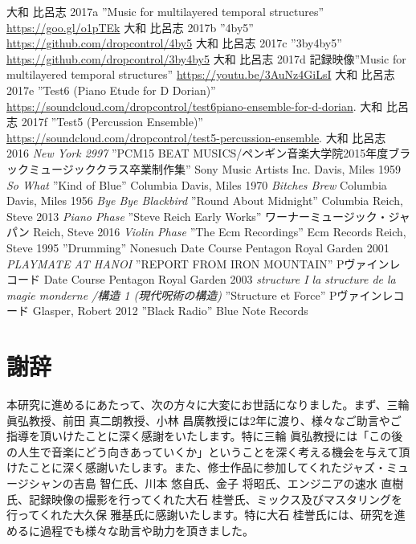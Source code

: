 \documentclass[uplatex,dvipdfmx]{ujarticle}
\begin{document}
\begin{referenceworks}{99}
 大和 比呂志 2017a ''Music for multilayered temporal structures'' \url{https://goo.gl/o1pTEk}
 大和 比呂志 2017b ''4by5'' \url{https://github.com/dropcontrol/4by5}
 大和 比呂志 2017c ''3by4by5'' \url{https://github.com/dropcontrol/3by4by5}
 大和 比呂志 2017d 記録映像''Music for multilayered temporal structures'' \url{https://youtu.be/3AuNz4GiLsI}
 大和 比呂志 2017e ''Test6 (Piano Etude for D Dorian)'' \url{https://soundcloud.com/dropcontrol/test6piano-ensemble-for-d-dorian}.
 大和 比呂志 2017f ''Test5 (Percussion Ensemble)'' \url{https://soundcloud.com/dropcontrol/test5-percussion-ensemble}.
 大和 比呂志 2016 {\it New York 2997} ''PCM15 BEAT MUSICS/ペンギン音楽大学院2015年度ブラックミュージッククラス卒業制作集'' Sony Music Artists Inc.
 Davis, Miles 1959 {\it So What} ''Kind of Blue'' Columbia
 Davis, Miles 1970 {\it Bitches Brew} Columbia
 Davis, Miles 1956 {\it Bye Bye Blackbird} ''Round About Midnight''  Columbia
 Reich, Steve 2013 {\it Piano Phase} ''Steve Reich Early Works'' ワーナーミュージック・ジャパン
 Reich, Steve 2016 {\it Violin Phase} ''The Ecm Recordings'' Ecm Records
 Reich, Steve 1995 ''Drumming'' Nonesuch
 Date Course Pentagon Royal Garden 2001 {\it PLAYMATE AT HANOI} ''REPORT FROM IRON MOUNTAIN'' Pヴァインレコード
 Date Course Pentagon Royal Garden 2003 {\it structure I la structure de la magie monderne /構造 1 (現代呪術の構造)} ''Structure et Force'' Pヴァインレコード
 Glasper, Robert 2012 ''Black Radio'' Blue Note Records
\end{referenceworks}

\afterpage{\clearpage}
\newpage

\section*{謝辞}

本研究に進めるにあたって、次の方々に大変にお世話になりました。まず、三輪 眞弘教授、前田 真二朗教授、小林 昌廣教授には2年に渡り、様々なご助言やご指導を頂いけたことに深く感謝をいたします。特に三輪 眞弘教授には「この後の人生で音楽にどう向きあっていくか」ということを深く考える機会を与えて頂けたことに深く感謝いたします。また、修士作品に参加してくれたジャズ・ミュージシャンの吉島 智仁氏、川本 悠自氏、金子 将昭氏、エンジニアの速水 直樹氏、記録映像の撮影を行ってくれた大石 桂誉氏、ミックス及びマスタリングを行ってくれた大久保 雅基氏に感謝いたします。特に大石 桂誉氏には、研究を進めるに過程でも様々な助言や助力を頂きました。\\
\end{document}
